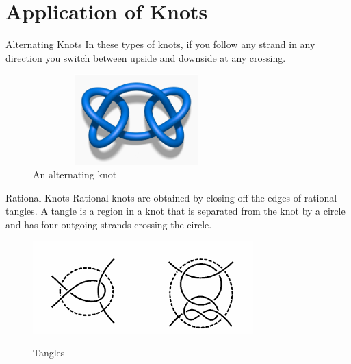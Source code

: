 \section{Application of Knots}
\begin{frame}{Alternating Knots}
 In these types of knots, if you follow any strand in any direction you switch between upside and downside at any crossing.
\begin{figure}
    \centering
    \includegraphics[height = 3.5cm, width= 8cm]{images/math.stackexchange.com accessed on 21.03.2025.png}
    \caption{An alternating knot}
    \label{alterknot}
\end{figure}
\cite{2660480}
\end{frame}
\begin{frame}{Rational Knots}
Rational knots are obtained by closing off the edges of rational tangles. A tangle is a region in a knot that is separated from the knot by a circle and has four outgoing strands crossing the circle. 
\begin{figure}[h]
    \includegraphics[width=0.6\linewidth]{images/tangles.png}
    \caption{Tangles}
    \label{tangles}
\cite{adams2004knot}
\end{figure}
\end{frame}
